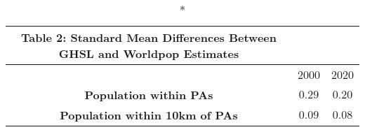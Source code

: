\begin{longtable}{ccc}
\caption*{
{\large Table 2: Standard Mean Differences Between GHSL and Worldpop Estimates}
} \\ 
\toprule
 & 2000 & 2020 \\ 
\midrule\addlinespace[2.5pt]
\textbf{Population within PAs} & $0.29$ & $0.20$ \\ 
\textbf{Population within 10km of PAs} & $0.09$ & $0.08$ \\ 
\bottomrule
\end{longtable}

